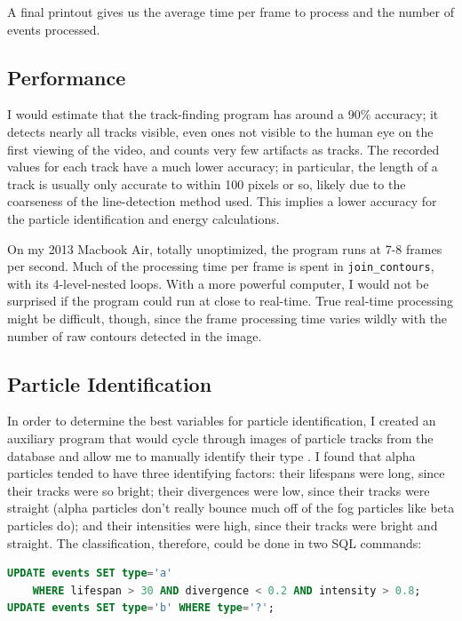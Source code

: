 \documentclass[notitlepage]{article}
\begin{document}
A final printout gives us the average time per frame to process and the number of events processed.

\subsection{Performance}

I would estimate that the track-finding program has around a 90\% accuracy; it detects nearly all tracks visible, even ones not visible to the human eye on the first viewing of the video, and counts very few artifacts as tracks.  The recorded values for each track have a much lower accuracy; in particular, the length of a track is usually only accurate to within 100 pixels or so, likely due to the coarseness of the line-detection method used.  This implies a lower accuracy for the particle identification and energy calculations.

On my 2013 Macbook Air, totally unoptimized, the program runs at 7-8 frames per second.  Much of the processing time per frame is spent in \texttt{join\_contours}, with its 4-level-nested loops.  With a more powerful computer, I would not be surprised if the program could run at close to real-time.  True real-time processing might be difficult, though, since the frame processing time varies wildly with the number of raw contours detected in the image.

\subsection{Particle Identification}

In order to determine the best variables for particle identification, I created an auxiliary program that would cycle through images of particle tracks from the database and allow me to manually identify their type \cite{wayne}.  I found that alpha particles tended to have three identifying factors: their lifespans were long, since their tracks were so bright; their divergences were low, since their tracks were straight (alpha particles don't really bounce much off of the fog particles like beta particles do); and their intensities were high, since their tracks were bright and straight.  The classification, therefore, could be done in two SQL commands:
\begin{lstlisting}[language=SQL]
UPDATE events SET type='a' 
    WHERE lifespan > 30 AND divergence < 0.2 AND intensity > 0.8;
UPDATE events SET type='b' WHERE type='?';
\end{lstlisting}
\end{document}
